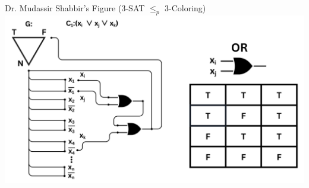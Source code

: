 \documentclass{beamer}
\begin{document}
\begin{frame}{Dr. Mudassir Shabbir's Figure (3-SAT $\leq_p$ 3-Coloring)}
    \includegraphics[width={\paperwidth-0.77cm}, height=\paperheight-2.0cm]{Professor's.png}
\end{frame}
\end{document}
